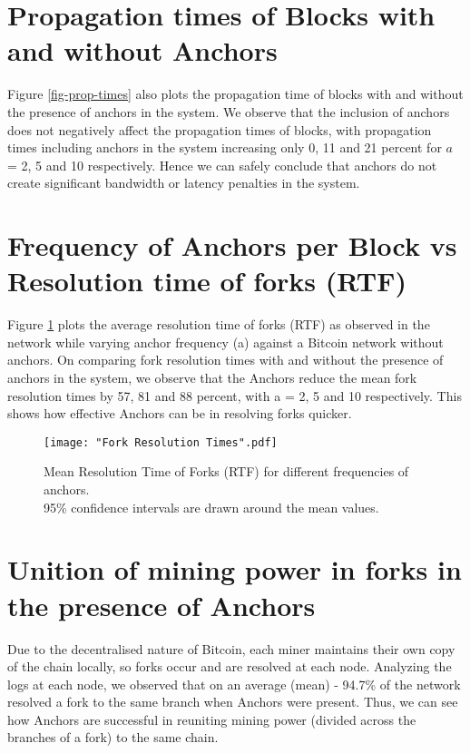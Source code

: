 \section{Propagation times of Blocks with and without Anchors} \label{res-prop-2}

Figure \ref{fig-prop-times} also plots the propagation time of blocks with and without the presence of anchors in the system. 
We observe that the inclusion of anchors does not negatively affect the propagation times of blocks, with propagation times including anchors in the system increasing only
0, 
11 and 
21 percent for $a$ = 2, 5 and 10 respectively. 
Hence we can safely conclude that anchors do not create significant bandwidth or latency penalties in the system. 

\section{Frequency of Anchors per Block vs Resolution time of forks (RTF)} \label{res-frt}

Figure \ref{fig-forks-rtf} plots the average resolution time of forks (RTF) as observed in the network while varying anchor frequency (a) against a Bitcoin network without anchors. 
On comparing fork resolution times with and without the presence of anchors in the system, we observe that the Anchors reduce the mean fork resolution times by 57, 81 and 88 percent, with a = 2, 5 and 10 respectively. 
This shows how effective Anchors can be in resolving forks quicker.

\begin{figure}[!htb]
    \centering
    \texttt{[image: "Fork Resolution Times".pdf]}
    \caption[Mean Resolution Time of Forks (RTF)]{
        Mean Resolution Time of Forks (RTF) for different frequencies of anchors. \\
        \footnotesize
        95\% confidence intervals are drawn around the mean values.
    }
    \label{fig-forks-rtf}
\end{figure}

\section{Unition of mining power in forks in the presence of Anchors} \label{res-unition}

Due to the decentralised nature of Bitcoin, each miner maintains their own copy of the chain locally, so forks occur and are resolved at each node.
Analyzing the logs at each node, we observed that on an average (mean) - 94.7\% of the network resolved a fork to the same branch when Anchors were present. 
Thus, we can see how Anchors are successful in reuniting mining power (divided across the branches of a fork) to the same chain.

